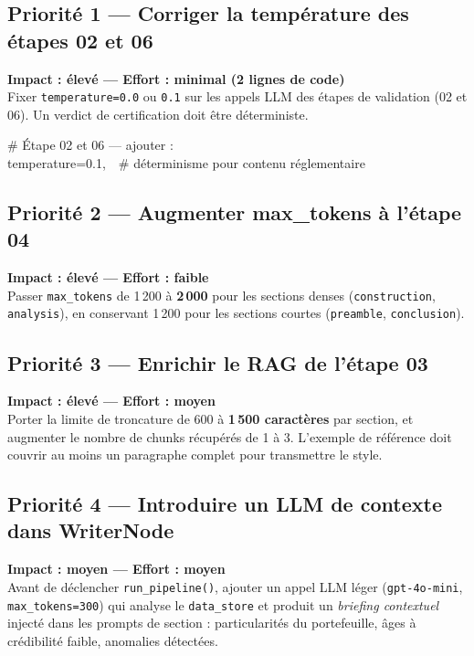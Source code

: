 \documentclass[12pt,a4paper]{article}
\begin{document}
\begin{improvebox}

\subsection*{Priorité 1 — Corriger la température des étapes 02 et 06}
\textbf{Impact : élevé — Effort : minimal (2 lignes de code)}\\
Fixer \texttt{temperature=0.0} ou \texttt{0.1} sur les appels LLM des étapes de validation
(02 et 06). Un verdict de certification doit être déterministe.

\begin{center}
\begin{tcolorbox}[colback=black!5, colframe=black!30, width=0.8\textwidth,
                  fontupper=\ttfamily\small, arc=3pt]
\# Étape 02 et 06 — ajouter :\\
temperature=0.1,~~\# déterminisme pour contenu réglementaire
\end{tcolorbox}
\end{center}

\subsection*{Priorité 2 — Augmenter max\_tokens à l'étape 04}
\textbf{Impact : élevé — Effort : faible}\\
Passer \texttt{max\_tokens} de 1\,200 à \textbf{2\,000} pour les sections denses
(\texttt{construction}, \texttt{analysis}), en conservant 1\,200 pour les sections
courtes (\texttt{preamble}, \texttt{conclusion}).

\subsection*{Priorité 3 — Enrichir le RAG de l'étape 03}
\textbf{Impact : élevé — Effort : moyen}\\
Porter la limite de troncature de 600 à \textbf{1\,500 caractères} par section,
et augmenter le nombre de chunks récupérés de 1 à 3. L'exemple de référence
doit couvrir au moins un paragraphe complet pour transmettre le style.

\subsection*{Priorité 4 — Introduire un LLM de contexte dans WriterNode}
\textbf{Impact : moyen — Effort : moyen}\\
Avant de déclencher \texttt{run\_pipeline()}, ajouter un appel LLM léger
(\texttt{gpt-4o-mini}, \texttt{max\_tokens=300}) qui analyse le \texttt{data\_store}
et produit un \emph{briefing contextuel} injecté dans les prompts de section :
particularités du portefeuille, âges à crédibilité faible, anomalies détectées.


\end{improvebox}
\end{document}
